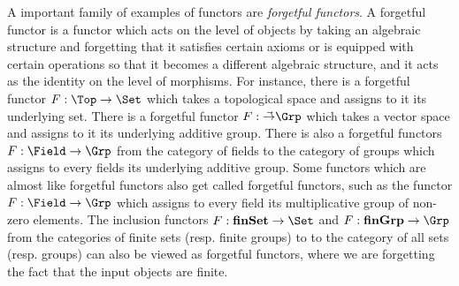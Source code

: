 \begin{ex} A important family of examples of functors are {\em forgetful functors}. A forgetful functor is a functor which acts on the level of objects by taking an algebraic structure and forgetting that it satisfies certain axioms or is equipped with certain operations so that it becomes a different algebraic structure, and it acts as the identity on the level of morphisms. For instance, there is a forgetful functor $F:\Top\to\Set$ which takes a topological space and assigns to it its underlying set. There is a forgetful functor $F:\Vec\to\Grp$ which takes a vector space and assigns to it its underlying additive group. There is also a forgetful functors $F:\Field\to \Grp$ from the category of fields to the category of groups which assigns to every fields its underlying additive group. Some functors which are almost like forgetful functors also get called forgetful functors, such as the functor $F:\Field\to\Grp$ which assigns to every field its multiplicative group of non-zero elements. The inclusion functors $F:{\bf finSet}\to \Set$ and $F:{\bf finGrp}\to\Grp$ from the categories of finite sets (resp. finite groups) to to the category of all sets (resp. groups) can also be viewed as forgetful functors, where we are forgetting the fact that the input objects are finite.
\end{ex}

